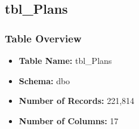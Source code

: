 \begin{landscape}
\subsection{tbl\_Plans}

\subsubsection{Table Overview}
\begin{itemize}
\item \textbf{Table Name:} tbl\_Plans
\item \textbf{Schema:} dbo
\item \textbf{Number of Records:} 221,814
\item \textbf{Number of Columns:} 17
\end{itemize}


\end{landscape}
